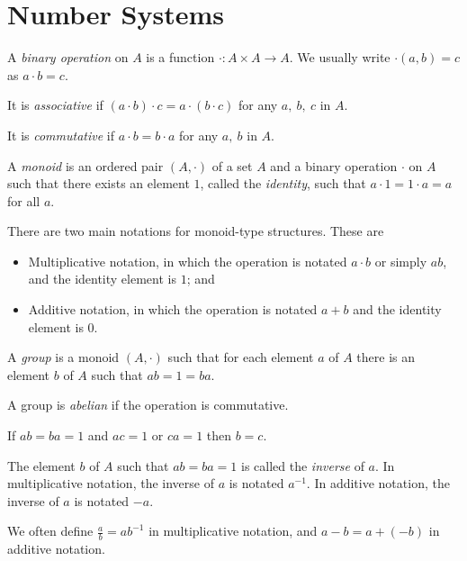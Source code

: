 \chapter{Number Systems}
  \begin{defn}
    A \emph{binary operation} on $A$ is a function $\cdot:A\times A\to A$. We
    usually write $\cdot(a,b)=c$ as $a\cdot b=c$.

    It is \emph{associative} if $(a\cdot b)\cdot c=a\cdot(b\cdot
    c)$ for any $a,\ b,\ c$ in $A$.

    It is \emph{commutative} if $a\cdot b=b\cdot a$ for any $a,\ b$ in $A$.
  \end{defn}
  \begin{defn}
    A \emph{monoid} is an ordered pair $(A,\cdot)$ of a set $A$ and a binary
    operation $\cdot$ on $A$ such that there exists an element $1$, called the
    \emph{identity}, such that $a\cdot 1=1\cdot a=a$ for all $a$.
  \end{defn}
  \begin{rem}
    There are two main notations for monoid-type structures. These are
    \begin{itemize}
      \item 
        Multiplicative notation, in which the operation is notated $a\cdot b$ or
        simply $ab$, and the identity element is $1$; and
      \item Additive notation, in which the operation is notated $a+b$ and the
        identity element is $0$.
    \end{itemize}
  \end{rem}
  \begin{defn}
    A \emph{group} is a monoid $(A,\cdot)$ such that for each element $a$ of $A$
    there is an element $b$ of $A$ such that
    $ab=1=ba$.
    
    A group is \emph{abelian} if the operation is commutative.
  \end{defn}
  \begin{prop}
    If $ab=ba=1$ and $ac=1$ or $ca=1$ then $b=c$.
  \end{prop}
  \begin{defn}
    The element $b$ of $A$ such that $ab=ba=1$ is called the \emph{inverse} of $a$.
    In multiplicative notation, the inverse of $a$ is notated $a^{-1}$.
    In additive notation, the inverse of $a$ is notated $-a$.
  \end{defn}
  \begin{rem}
    We often define $\frac ab=ab^{-1}$ in multiplicative notation, and
    $a-b=a+(-b)$ in additive notation.
  \end{rem}
